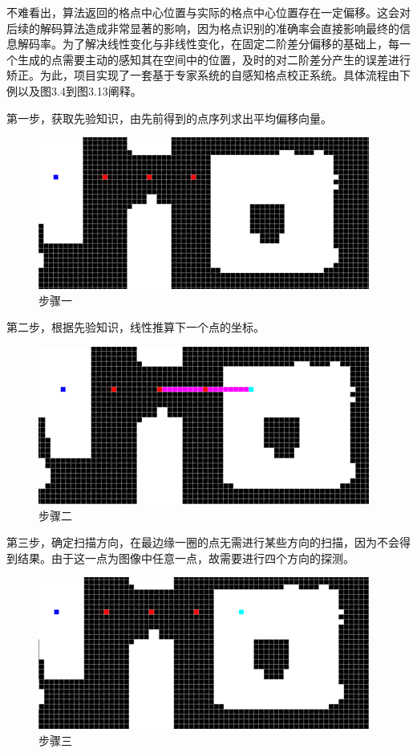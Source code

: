 不难看出，算法返回的格点中心位置与实际的格点中心位置存在一定偏移。这会对后续的解码算法造成非常显著的影响，因为格点识别的准确率会直接影响最终的信息解码率。为了解决线性变化与非线性变化，在固定二阶差分偏移的基础上，每一个生成的点需要主动的感知其在空间中的位置，及时的对二阶差分产生的误差进行矫正。为此，项目实现了一套基于专家系统的自感知格点校正系统。具体流程由下例以及图3.4到图3.13阐释。

第一步，获取先验知识，由先前得到的点序列求出平均偏移向量。

\begin{figure}[!htbp]
\centering
\includegraphics[scale=1]{figures/QR_Prf/图片1.png}
\caption{步骤一}
\end{figure}

第二步，根据先验知识，线性推算下一个点的坐标。

\begin{figure}[!htbp]
\centering
\includegraphics[scale=1]{figures/QR_Prf/图片2.png}
\caption{步骤二}
\end{figure}

第三步，确定扫描方向，在最边缘一圈的点无需进行某些方向的扫描，因为不会得到结果。由于这一点为图像中任意一点，故需要进行四个方向的探测。

\begin{figure}[!htbp]
\centering
\includegraphics[scale=1]{figures/QR_Prf/图片3.png}
\caption{步骤三}
\end{figure}

